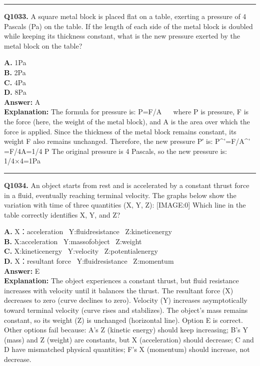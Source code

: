 \documentclass[12pt]{article}
\begin{document}
\hrule
\vspace{1em}


\noindent
\textbf{Q1033.} A square metal block is placed flat on a table, exerting a pressure of 4 Pascals (Pa) on the table. If the length of each side of the metal block is doubled while keeping its thickness constant, what is the new pressure exerted by the metal block on the table?



\textbf{A.} 1Pa \\
\textbf{B.} 2Pa \\
\textbf{C.} 4Pa \\
\textbf{D.} 8Pa \\

\textbf{Answer:} A \\
\textbf{Explanation:} The formula for pressure is: P=F/A    where P is pressure, F is the force (here, the weight of the metal block), and A is the area over which the force is applied. Since the thickness of the metal block remains constant, its weight F also remains unchanged. Therefore, the new pressure P′ is: P^'=F/A^' =F/4A=1/4 P The original pressure is 4 Pascals, so the new pressure is: 1/4×4=1Pa

\hrule
\vspace{1em}


\noindent
\textbf{Q1034.} An object starts from rest and is accelerated by a constant thrust force in a fluid, eventually reaching terminal velocity. The graphs below show the variation with time of three quantities (X, Y, Z):
[IMAGE:0]
Which line in the table correctly identifies X, Y, and Z?



\textbf{A.} X：acceleration  Y:fluidresistance  Z:kineticenergy \\
\textbf{B.} X:acceleration  Y:massofobject  Z:weight \\
\textbf{C.} X:kineticenergy  Y:velocity  Z:potentialenergy \\
\textbf{D.} X：resultant force  Y:fluidresistance  Z:momentum \\

\textbf{Answer:} E \\
\textbf{Explanation:} The object experiences a constant thrust, but fluid resistance increases with velocity until it balances the thrust. The resultant force (X) decreases to zero (curve declines to zero). Velocity (Y) increases asymptotically toward terminal velocity (curve rises and stabilizes). The object’s mass remains constant, so its weight (Z) is unchanged (horizontal line). Option E is correct. Other options fail because: A’s Z (kinetic energy) should keep increasing; B’s Y (mass) and Z (weight) are constants, but X (acceleration) should decrease; C and D have mismatched physical quantities; F’s X (momentum) should increase, not decrease.
\end{document}
